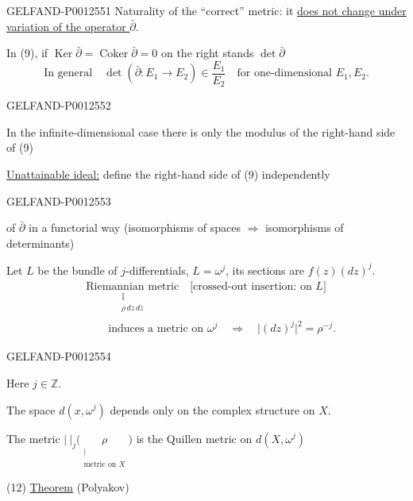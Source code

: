\begin{GelfandAdjacentEvidence}{GELFAND-P001255}{1}
Naturality of the “correct” metric: it \underline{does not change under variation of the operator $\bar\partial$}.

In (9), if $\operatorname{Ker}\bar\partial=\operatorname{Coker}\bar\partial=0$
on the right stands $\det\bar\partial$
\begin{equation*}
\text{In general}\quad
\det(\bar\partial:E_1\to E_2)\in\frac{E_1}{E_2}
\quad\text{for one-dimensional }E_1,E_2.
\end{equation*}
\end{GelfandAdjacentEvidence}
\begin{GelfandAdjacentEvidence}{GELFAND-P001255}{2}

In the infinite-dimensional case there is only the modulus of the right-hand side of (9)

\underline{Unattainable ideal:} define the right-hand side of (9) independently
\end{GelfandAdjacentEvidence}
\begin{GelfandAdjacentEvidence}{GELFAND-P001255}{3}

of $\bar\partial$ in a functorial way (isomorphisms of spaces $\Rightarrow$ isomorphisms of determinants)

Let $L$ be the bundle of $j$-differentials, $L=\omega^j$,
its sections are $f(z)(dz)^j$.
\begin{equation*}
\begin{aligned}
&\underset{\substack{\Vert\\\rho\,dz\,d\bar z}}{\text{Riemannian metric}}
\quad\text{[crossed-out insertion: on $L$]}\\
&\qquad\text{induces a metric on }\omega^j
\quad\Rightarrow\quad \lvert(dz)^j\rvert^2=\rho^{-j}.
\end{aligned}\tag{11}
\end{equation*}
\end{GelfandAdjacentEvidence}
\begin{GelfandAdjacentEvidence}{GELFAND-P001255}{4}

Here $j\in\mathbb Z$.

The space $d(x,\omega^j)$ depends only on the complex structure on $X$.

The metric $\lvert\ \rvert_j\bigl(\underset{\substack{\vert\\\text{metric on $X$}}}{\rho}\bigr)$
is the Quillen metric on $d(X,\omega^j)$

\noindent (12) \underline{Theorem} (Polyakov)
\end{GelfandAdjacentEvidence}
